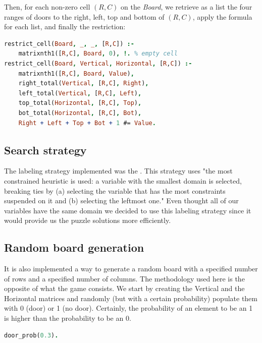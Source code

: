 \documentclass[runningheads]{llncs}
\newcommand*{\ttd}[1]{\texttt{\detokenize{#1}}}
\begin{document}
Then, for each non-zero cell $(R,C)$ on the \textsl{Board}, we retrieve as a list the four ranges of doors to the right, left, top and bottom of $(R,C)$, apply the formula for each list, and finally the restriction:

\begin{center}
\begin{minipage}{0.85\textwidth}
\centering\ttfamily
\begin{lstlisting}[language=Prolog]
restrict_cell(Board, _, _, [R,C]) :-
    matrixnth1([R,C], Board, 0), !. % empty cell
restrict_cell(Board, Vertical, Horizontal, [R,C]) :-
    matrixnth1([R,C], Board, Value),
    right_total(Vertical, [R,C], Right),
    left_total(Vertical, [R,C], Left),
    top_total(Horizontal, [R,C], Top),
    bot_total(Horizontal, [R,C], Bot),
    Right + Left + Top + Bot + 1 #= Value.
\end{lstlisting}
\end{minipage}
\end{center}

\subsection{Search strategy}
\label{subsec:searchstrategy}
The labeling strategy implemented was the \ttd{ffc}. This strategy uses "the most constrained heuristic is used: a variable with the smallest domain is selected, breaking ties by (a) selecting the variable that has the most constraints suspended on it and (b) selecting the leftmost one." Even thought all of our variables have the same domain we decided to use this labeling strategy since it would provide us the puzzle solutions more efficiently.

\subsection{Random board generation}
\label{subsec:randomboard}
It is also implemented a way to generate a random board with a specified number of rows and a specified number of columns. The methodology used here is the opposite of what the game consists. We start by creating the Vertical and the Horizontal matrices and randomly (but with a certain probability) populate them with 0 (door) or 1 (no door). Certainly, the probability of an element to be an 1 is higher than the probability to be an 0.

\begin{center}
\begin{minipage}{0.25\textwidth}
\centering\ttfamily
\begin{lstlisting}[language=Prolog]
door_prob(0.3).
\end{lstlisting}
\end{minipage}
\end{center}
\end{document}

